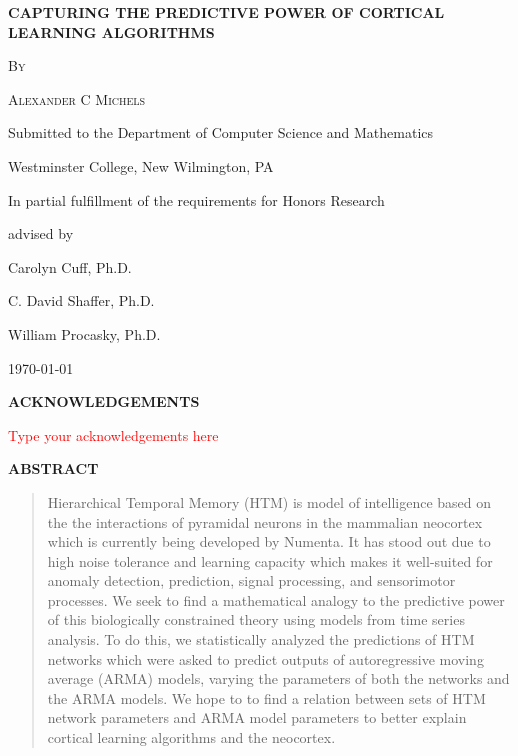 \documentclass[oneside,12pt,openany]{book}
\renewcommand{\baselinestretch}{1.5}
\begin{document}
	\frontmatter
	\begin{titlepage}
		\centering
		{\scshape\Large \textbf{CAPTURING THE PREDICTIVE POWER OF CORTICAL LEARNING ALGORITHMS} \par}
		\vspace{5.5cm}
		{\scshape\large By \par}
		{\scshape\large Alexander C Michels\par}
		\vfill
		{\large Submitted to the Department of Computer Science and Mathematics\par}
		{\large Westminster College, New Wilmington, PA\par}
		{\large In partial fulfillment of the requirements for Honors Research\par}

		\vfill
		advised by\par
		\large
		Carolyn Cuff, Ph.D.\par
		C. David Shaffer, Ph.D.\par
		William Procasky, Ph.D.\par
		
		\vfill
		
		{\large \today\par}
	\end{titlepage}
	\renewcommand{\baselinestretch}{.7}
	\setcounter{tocdepth}{1}
	\tableofcontents
	\vfill
	\pagebreak
	
	\renewcommand{\baselinestretch}{1.5}
	
	\begin{center}
		\textbf{ACKNOWLEDGEMENTS}
	\end{center}

	\textcolor{red}{Type your acknowledgements here}
	\vfill
	\pagebreak
	
	\begin{center}
		\textbf{ABSTRACT}
		
		\begin{quotation}
			\noindent Hierarchical Temporal Memory (HTM) is model of intelligence based on the the interactions of pyramidal neurons in the mammalian neocortex which is currently being developed by Numenta. It has stood out due to high noise tolerance and learning capacity which makes it well-suited for anomaly detection, prediction, signal processing, and sensorimotor processes. We seek to find a mathematical analogy to the predictive power of this biologically constrained theory using models from time series analysis. To do this, we statistically analyzed the predictions of HTM networks which were asked to predict outputs of autoregressive moving average (ARMA) models, varying the parameters of both the networks and the ARMA models. We hope to to find a relation between sets of HTM network parameters and ARMA model parameters to better explain cortical learning algorithms and the neocortex.
		\end{quotation}
		
	\end{center}
	\vfill
	\pagebreak
	
\end{document}
